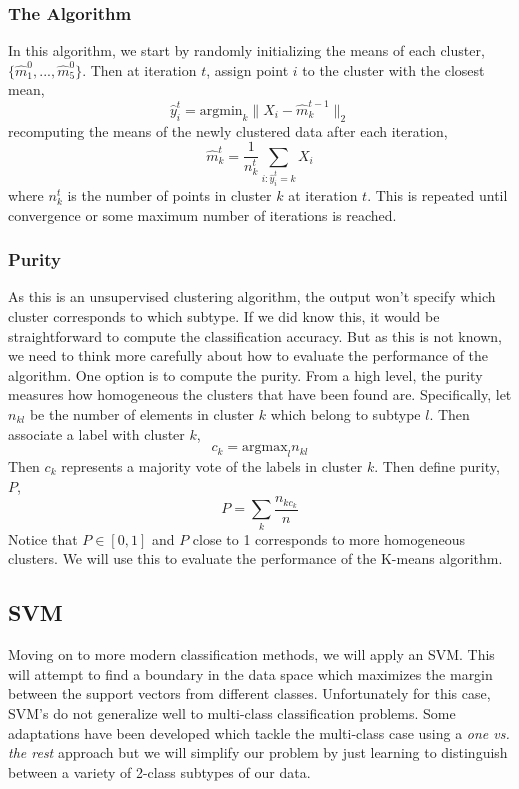 \documentclass{article}
\begin{document}
\subsubsection{The Algorithm}
In this algorithm, we start by randomly initializing the means of each cluster, $\{\hat{m}^0_1, ..., \hat{m}^0_5\}$. Then at iteration $t$, assign point $i$ to the cluster with the closest mean,
\[ \hat{y}_i^t = \mbox{argmin}_k \|X_i - \hat{m}^{t-1}_k\|_2 \]
recomputing the means of the newly clustered data after each iteration,
\[ \hat{m}^t_k = \frac{1}{n^t_k}\sum\limits_{i: \hat{y}_i^t = k} X_i \]
where $n_k^t$ is the number of points in cluster $k$ at iteration $t$. This is repeated until convergence or some maximum number of iterations is reached.
\subsubsection{Purity}
As this is an unsupervised clustering algorithm, the output won't specify which cluster corresponds to which subtype. If we did know this, it would be straightforward to compute the classification accuracy. But as this is not known, we need to think more carefully about how to evaluate the performance of the algorithm.
\newline\newline One option is to compute the purity. From a high level, the purity measures how homogeneous the clusters that have been found are. Specifically, let $n_{kl}$ be the number of elements in cluster $k$ which belong to subtype $l$. Then associate a label with cluster $k$,
\[ c_k = \mbox{argmax}_l n_{kl} \]
Then $c_k$ represents a majority vote of the labels in cluster $k$. Then define purity, $P$,
\[ P = \sum\limits_{k} \frac{n_{kc_k}}{n} \]
Notice that $P \in [0,1]$ and $P$ close to 1 corresponds to more homogeneous clusters. We will use this to evaluate the performance of the K-means algorithm.

\subsection{SVM}
Moving on to more modern classification methods, we will apply an SVM. This will attempt to find a boundary in the data space which maximizes the margin between the support vectors from different classes. Unfortunately for this case, SVM's do not generalize well to multi-class classification problems. Some adaptations have been developed which tackle the multi-class case using a \textit{one vs. the rest} approach but we will simplify our problem by just learning to distinguish between a variety of 2-class subtypes of our data.
\end{document}
